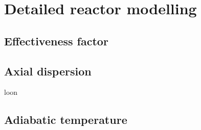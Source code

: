 \section{Detailed reactor modelling}
\subsection{Effectiveness factor}

\subsection{Axial dispersion}
loon

\subsection{Adiabatic temperature}